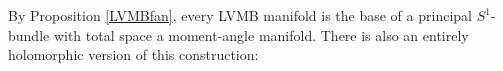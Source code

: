 \documentclass[a4paper]{amsart}
\newtheorem{proposition}[theorem]{Proposition}
\theoremstyle{definition}
\theoremstyle{remark}
\numberwithin{equation}{section}
\def\R{\mathbb R}
\def\C{\mathbb C}
\def\R{\mathbb R}
\def\sK{\mathcal K}
\newcommand{\mb}[1]{{\textbf {\textit#1}}}
\newcommand{\zk}{\mathcal Z_{\mathcal K}}
\newcommand{\<}{\langle}
\renewcommand{\>}{\rangle}
\begin{document}

By Proposition \ref{LVMBfan}, every LVMB manifold is the base of a principal $S^1$-bundle with total space a moment-angle manifold. There is also an entirely holomorphic version of this construction:
\end{document}
